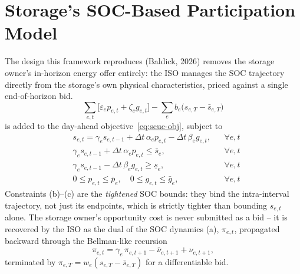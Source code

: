 \documentclass[10pt,conference]{IEEEtran}
\begin{document}
\section{Storage's SOC-Based Participation Model}
\label{sec:storage}
The design this framework reproduces (Baldick, 2026) removes the storage owner's
in-horizon energy offer entirely: the ISO manages the SOC trajectory directly from the
storage's own physical characteristics, priced against a single end-of-horizon bid.
\begin{equation}
\sum_{e,t}\big[\varepsilon_e p_{e,t} + \zeta_e g_{e,t}\big] - \sum_e b_e\big(s_{e,T}-\bar s_{e,T}\big)
\end{equation}
is added to the day-ahead objective~\eqref{eq:scuc-obj}, subject to
\begin{align*}
&s_{e,t} = \gamma_e s_{e,t-1} + \Delta t\,\alpha_e p_{e,t} - \Delta t\,\beta_e g_{e,t}, && \forall e,t \tag{a}\\
&\gamma_e s_{e,t-1}+\Delta t\,\alpha_e p_{e,t} \le \bar s_e, && \forall e,t \tag{b}\\
&\gamma_e s_{e,t-1}-\Delta t\,\beta_e g_{e,t} \ge \underline s_e, && \forall e,t \tag{c}\\
&0\le p_{e,t}\le \bar p_e,\quad 0\le g_{e,t}\le \bar g_e, && \forall e,t \tag{d}
\end{align*}
Constraints (b)--(c) are the \emph{tightened} SOC bounds: they bind the intra-interval
trajectory, not just its endpoints, which is strictly tighter than bounding $s_{e,t}$
alone. The storage owner's opportunity cost is never submitted as a bid -- it is
recovered by the ISO as the dual of the SOC dynamics (a), $\pi_{e,t}$, propagated
backward through the Bellman-like recursion
\begin{equation}
\pi_{e,t} = \gamma_e\,\pi_{e,t+1} - \bar\nu_{e,t+1} + \nu_{e,t+1},
\end{equation}
terminated by $\pi_{e,T} = w_e(s_{e,T}-\bar s_{e,T})$ for a differentiable bid.
\end{document}
